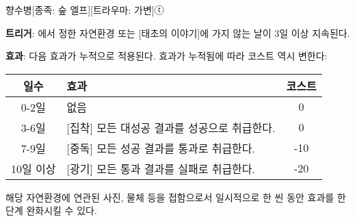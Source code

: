 \documentclass{report}
\begin{document}
	\begin{story}{향수병}{[종족: 숲 엘프][트라우마: 가변]ⓣ}
		
		\textbf{트리거}: 에서 정한 자연환경 또는 [태초의 이야기]에 가지 않는 날이 3일 이상 지속된다.
		
		\textbf{효과}: 다음 효과가 누적으로 적용된다. 효과가 누적됨에 따라 코스트 역시 변한다:
		\begin{center}
			\begin{tabular}{c|l|c}
				\textbf{일수}      & \textbf{효과}                                & \textbf{코스트}\\\hline\hline
				0-2일              & 없음                                         & 0              \\\hline
				3-6일              & [집착] 모든 대성공 결과를 성공으로 취급한다. & 0              \\\hline
				7-9일              & [중독] 모든 성공 결과를 통과로 취급한다.     & -10            \\\hline
				10일 이상          & [광기] 모든 통과 결과를 실패로 취급한다.     & -20            \\
			\end{tabular}
		\end{center}
		
		해당 자연환경에 연관된 사진, 물체 등을 접함으로서 일시적으로 한 씬 동안 효과를 한 단계 완화시킬 수 있다.
	\end{story}
\end{document}
